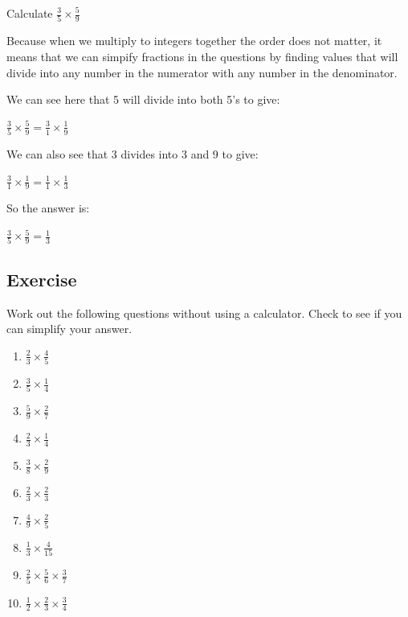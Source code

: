 \begin{exmp}
Calculate $\displaystyle \frac{3}{5} \times \frac{5}{9}$

\bigskip

\noindent Because when we multiply to integers together the order does not matter, it means that we can simpify fractions in the questions by finding values that will divide into any number in the numerator with any number in the denominator.

We can see here that 5 will divide into both 5's to give:\bigskip

$\displaystyle \frac{3}{5} \times \frac{5}{9} = \frac{3}{1} \times \frac{1}{9}$

\bigskip

We can also see that 3 divides into 3 and 9 to give:\bigskip

$\displaystyle \frac{3}{1} \times \frac{1}{9} = \frac{1}{1} \times \frac{1}{3}$

\bigskip

So the answer is:\bigskip

$\displaystyle \frac{3}{5} \times \frac{5}{9} = \frac{1}{3}$
\end{exmp}
\subsection{Exercise}
Work out the following questions without using a calculator.  Check to see if you can simplify your answer.
\begin{multicols}{2}
\begin{enumerate}
	\item $\displaystyle \frac{2}{3} \times \frac{4}{5}$
	\item $\displaystyle \frac{3}{5} \times \frac{1}{4}$
	\item $\displaystyle \frac{5}{9} \times \frac{2}{7}$
	\item $\displaystyle \frac{2}{3} \times \frac{1}{4}$
	\item $\displaystyle \frac{3}{8} \times \frac{2}{9}$
	\item $\displaystyle \frac{2}{3} \times \frac{2}{3}$
	\item $\displaystyle \frac{4}{9} \times \frac{2}{5}$
	\item $\displaystyle \frac{1}{3} \times \frac{4}{15}$
	\item $\displaystyle \frac{2}{5} \times \frac{5}{6} \times \frac{3}{7}$
	\item $\displaystyle \frac{1}{2} \times \frac{2}{3} \times \frac{3}{4}$
\end{enumerate}
\end{multicols}
